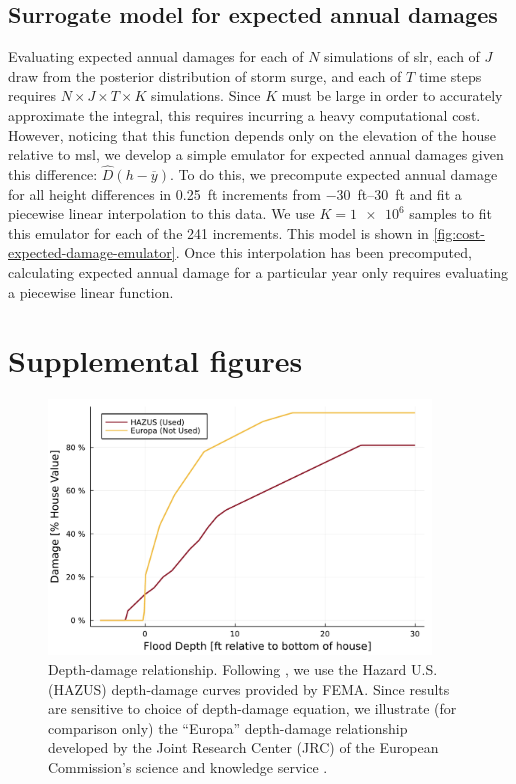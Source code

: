 \documentclass[11pt]{article}
\begin{document}
\subsection{Surrogate model for expected annual damages}\label{sec:surrogate-ead}
Evaluating expected annual damages for each of $N$ simulations of \gls{slr}, each of $J$ draw from the posterior distribution of storm surge, and each of $T$ time steps requires $N \times J \times T \times K$ simulations.
Since $K$ must be large in order to accurately approximate the integral, this requires incurring a heavy computational cost.
However, noticing that this function depends only on the elevation of the house relative to \gls{msl}, we develop a simple emulator for expected annual damages given this difference: $\hat{D}(h - \overline{y})$.
To do this, we  precompute expected annual damage for all height differences in \SI{0.25}{ft} increments from \SIrange{-30}{30}{ft} and fit a piecewise linear interpolation to this data.
We use $K=\num{1e6}$ samples to fit this emulator for each of the 241 increments.
This model is shown in \cref{fig:cost-expected-damage-emulator}.
Once this interpolation has been precomputed, calculating expected annual damage for a particular year only requires evaluating a piecewise linear function.

\section{Supplemental figures}

\begin{figure}
    \centering
    \includegraphics[width=4in]{cost-depth-damage}
    \caption{
        Depth-damage relationship.
        Following \citet{zarekarizi_suboptimal:2020}, we use the Hazard U.S. (HAZUS) depth-damage curves provided by FEMA.
        Since results are sensitive to choice of depth-damage equation, we illustrate (for comparison only) the ``Europa'' depth-damage relationship developed by the Joint Research Center (JRC) of the European Commission's science and knowledge service \citep{huizinga_depthdamage:2016}.
    }\label{fig:cost-depth-damage}
\end{figure}
\end{document}
